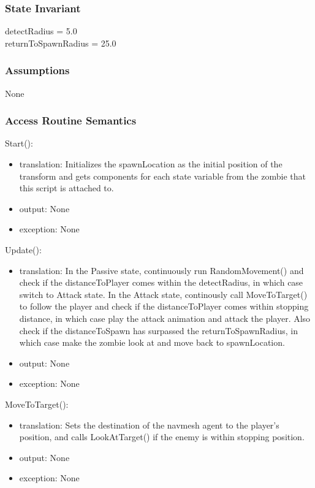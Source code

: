 \documentclass[12pt]{article}
\begin{document}
\subsubsection* {State Invariant}

detectRadius = 5.0 \\
returnToSpawnRadius = 25.0 \\

\subsubsection* {Assumptions}

None

\subsubsection* {Access Routine Semantics}

\noindent Start():
\begin{itemize}
\item translation: Initializes the spawnLocation as the initial position of the transform and gets components for each state variable from the zombie that this script is attached to.
\item output: None
\item exception: None
\end{itemize}

\noindent Update():
\begin{itemize}
\item translation: In the Passive state, continuously run RandomMovement() and check if the distanceToPlayer comes within the detectRadius, in which case switch to Attack state. In the Attack state, continously call MoveToTarget() to follow the player and check if the distanceToPlayer comes within stopping distance, in which case play the attack animation and attack the player. Also check if the distanceToSpawn has surpassed the returnToSpawnRadius, in which case make the zombie look at and move back to spawnLocation.
\item output: None
\item exception: None
\end{itemize}

\noindent MoveToTarget():
\begin{itemize}
\item translation: Sets the destination of the navmesh agent to the player's position, and calls LookAtTarget() if the enemy is within stopping position.
\item output: None
\item exception: None
\end{itemize}
\end{document}

